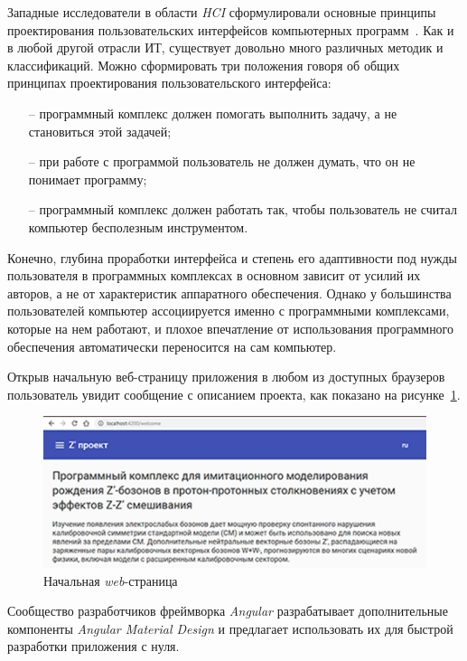 Западные исследователи в области \textit{HCI} сформулировали основные
принципы проектирования пользовательских интерфейсов компьютерных
программ~\cite{user-interface}. Как и в любой другой отрасли ИТ, существует довольно много
различных методик и классификаций. Можно сформировать три положения
говоря об общих принципах проектирования пользовательского интерфейса:

\begin{enumerate}
	\item[--] программный комплекс должен помогать выполнить задачу, а не
	становиться этой задачей;
	\item[--] при работе с программой пользователь не должен думать, что он не
	понимает программу;

	\item[--] программный комплекс должен работать так, чтобы пользователь не
	считал компьютер бесполезным инструментом.
\end{enumerate}

Конечно, глубина проработки интерфейса и степень его адаптивности под
нужды пользователя в программных комплексах в основном зависит от усилий
их авторов, а не от характеристик аппаратного обеспечения. Однако у
большинства пользователей компьютер ассоциируется именно с программными
комплексами, которые на нем работают, и плохое впечатление от использования
программного обеспечения автоматически переносится на сам компьютер.

Открыв начальную веб-страницу приложения в любом из доступных браузеров пользователь увидит сообщение с описанием проекта, как показано на рисунке~\ref{fig:welcome-page}.

\begin{figure}[!h]
	\centering
	\includegraphics[width=\textwidth]{figures/welcome-page.png}
	\caption{Начальная \textit{web}-страница}
	\label{fig:welcome-page}
\end{figure}

Сообщество разработчиков фреймворка \textit{Angular} разрабатывает дополнительные компоненты \textit{Angular Material Design} и предлагает использовать их для быстрой разработки приложения с нуля. 

